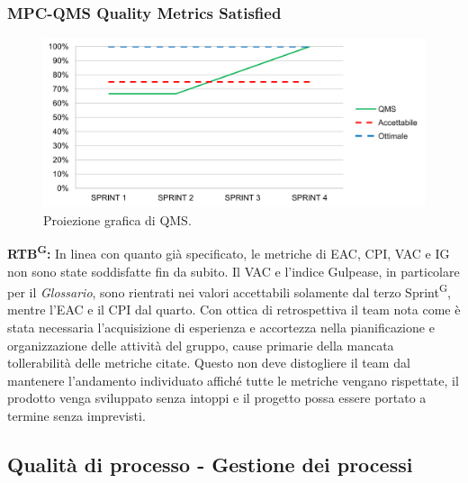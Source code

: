 \documentclass[8pt]{article}
\newcommand{\glossterm}[1]{#1\textsuperscript{G}} %
\begin{document}
\subsubsection{MPC-QMS Quality Metrics Satisfied}
\begin{figure}[h!]
    \centering
    \includegraphics[width=1\textwidth]{images/QMS.png}
    \caption{Proiezione grafica di QMS.}
    \label{fig:Proiezione grafica di QMS}
\end{figure}
\textbf{\glossterm{RTB}:} In linea con quanto già specificato, le metriche di EAC, CPI, VAC e IG non sono state soddisfatte fin da subito. Il VAC e l'indice Gulpease, in particolare per il \textit{Glossario}, sono rientrati nei valori accettabili solamente dal terzo \glossterm{Sprint}, mentre l'EAC e il CPI dal quarto. Con ottica di retrospettiva il team nota come è stata necessaria l'acquisizione di esperienza e accortezza nella pianificazione e organizzazione delle attività del gruppo, cause primarie della mancata tollerabilità delle metriche citate. Questo non deve distogliere il team dal mantenere l'andamento individuato affiché tutte le metriche vengano rispettate, il prodotto venga sviluppato senza intoppi e il progetto possa essere portato a termine senza imprevisti. 
\clearpage
\subsection{Qualità di processo - Gestione dei processi}
\end{document}
